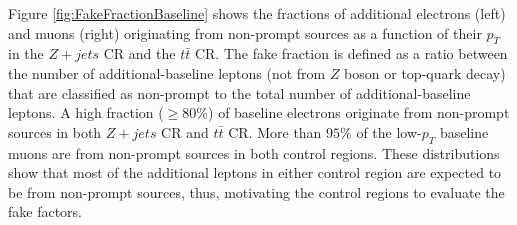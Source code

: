 Figure \ref{fig:FakeFractionBaseline} shows the fractions of additional electrons (left) and muons (right) originating from non-prompt sources as a function of their $p_{T}$ in the $Z+jets$ CR and the $t\bar{t}$ CR. The fake fraction is defined as a ratio between the number of additional-baseline leptons (not from $Z$ boson or top-quark decay) that are classified as non-prompt to the total number of additional-baseline leptons. A high fraction ($\geq 80\%$) of baseline electrons originate from non-prompt sources in both $Z+jets$ CR and $t\bar{t}$ CR. More than $95\%$ of the low-$p_{T}$ baseline muons are from non-prompt sources in both control regions. These distributions show that most of the additional leptons in either control region are expected to be from non-prompt sources, thus,  motivating the control regions to evaluate the fake factors.

